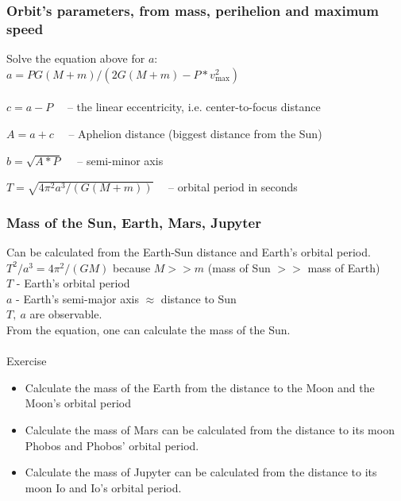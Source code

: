 \documentclass[aspectratio=169,xcolor=pdftex,dvipsnames]{beamer} %
\begin{document}

\begin{frame}
\frametitle{Orbit's parameters, from mass, perihelion and maximum speed}

Solve the equation above for $a$:\\
$a = PG(M+m) / (2G(M+m)-P*v_{\text{max}}^2)$\\
\ \\
$c = a - P$ \ \ -- the linear eccentricity, i.e. center-to-focus distance

$A = a + c$ \ \ -- Aphelion distance (biggest distance from the Sun)

$b = \sqrt{A*P}$  \ \ -- semi-minor axis
    
$T = \sqrt{ 4\pi^2a^3 / (G(M+m)) }$ \ \ -- orbital period in seconds

\end{frame}


\begin{frame}
\frametitle{Mass of the Sun, Earth, Mars, Jupyter}

Can be calculated from the Earth-Sun distance and Earth's orbital period.\\
$T^2 / a^3 = 4 \pi^2 / (GM)$ because $M>\!\!>m$ (mass of Sun $>\!\!>$ mass of Earth)\\
$T$ - Earth's orbital period\\
$a$ - Earth's semi-major axis $\approx$ distance to Sun\\
$T,\  a$ are observable.\\
From the equation, one can calculate the mass of the Sun.\\ 
\ \\
Exercise
\begin{itemize}
\item
Calculate the mass of the Earth
from the distance to the Moon and the Moon's orbital period
\item
Calculate the mass of Mars can be calculated 
from the distance to its moon Phobos and Phobos' orbital period.
\item
Calculate the mass of Jupyter can be calculated 
from the distance to its moon Io and Io's orbital period.
\end{itemize}
\end{frame}
\end{document}
